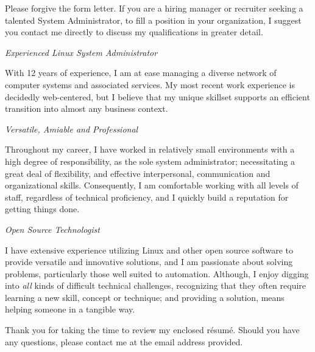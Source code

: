 \documentclass[11pt,letterpaper,sans]{moderncv}
\def\Resume{{r\'{e}sum\'{e}}}
\begin{document}
Please forgive the form letter. If you are a hiring manager or recruiter seeking a talented
System Administrator, to fill a position in your organization, I suggest you contact me 
directly to discuss my qualifications in greater detail. 

\emph{\newline{}Experienced Linux System Administrator}

With 12 years of experience, I am at ease managing a diverse network of computer systems and associated
services. My most recent work experience is decidedly web-centered, but I believe that my unique
skillset supports an efficient transition into almost any business context. 

\emph{\newline{}Versatile, Amiable and Professional}

Throughout my career, I have worked in relatively small environments with a high degree of 
responsibility, as the sole system administrator; necessitating a great deal of flexibility, and 
effective interpersonal, communication and organizational skills. Consequently, I am comfortable working 
with all levels of staff, regardless of technical proficiency, and I quickly build a reputation 
for getting things done. 

\emph{\newline{}Open Source Technologist}

I have extensive experience utilizing Linux and other open source software to provide versatile and 
innovative solutions, and I am passionate about solving problems, particularly those well suited to 
automation. Although, I enjoy digging into \emph{all} kinds of difficult technical challenges, recognizing 
that they often require learning a new skill, concept or technique; and providing a solution, means 
helping someone in a tangible way.\newline

Thank you for taking the time to review my enclosed \Resume. Should you have any questions, please
contact me at the email address provided.

\makeletterclosing
\end{document}
